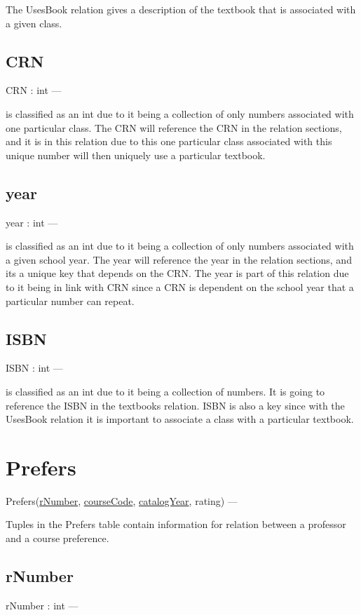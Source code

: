 \documentclass[10pt]{article}
\begin{document}
The UsesBook relation gives a description of the textbook that is associated with a given class.
	
	\subsection{CRN}
 	CRN : int --- 
 	
 	is classified as an int due to it being a collection of only numbers associated with one particular class. The CRN will reference the CRN in the relation sections, and it is in this relation due to this one particular class associated with this unique number will then uniquely use a particular textbook.
	
	\subsection{year}
	year : int ---
	
	is classified as an int due to it being a collection of only numbers associated with a given school year. The year will reference the year in the relation sections, and its a unique key that depends on the CRN. The year is part of this relation due to it being in link with CRN since a CRN is dependent on the school year that a particular number can 	repeat.
	
	\subsection{ISBN}
 	ISBN : int --- 
 	
 	is classified as an int due to it being a collection of numbers. It is going to reference the ISBN in the textbooks relation. ISBN is also a key since with the UsesBook relation it is important to associate a class with a particular textbook.
	
	
\section{Prefers}
Prefers(\underline{rNumber}, \underline{courseCode}, \underline{catalogYear}, rating) ---

Tuples in the Prefers table contain information for relation between a professor and a course preference.
	
	\subsection{rNumber}
	rNumber : int ---
	
\end{document}

